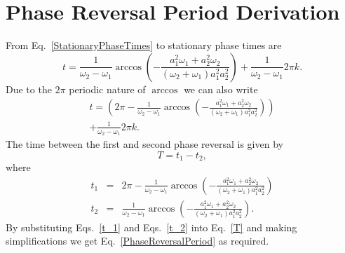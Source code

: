 \documentclass[11pt,draftcls,onecolumn]{IEEEtran}
\begin{document}
\section{Phase Reversal Period Derivation}\label{ReversalPeriodDerivation}
From Eq.~\ref{StationaryPhaseTimes} to stationary phase times are
\begin{equation}
    t=\frac{1}{\omega_2-\omega_1}\arccos\left(-\frac{a_1^2\omega_1 + a_2^2\omega_2}{(\omega_2 +
    \omega_1)a_1^2a_2^2}\right)+\frac{1}{\omega_2-\omega_1}2\pi k.
\end{equation}
Due to the $2\pi$ periodic nature of $\arccos$ we can also write
\begin{eqnarray}
    t= \left(2\pi - \frac{1}{\omega_2-\omega_1}\arccos\left(-\frac{a_1^2\omega_1 + a_2^2\omega_2}{(\omega_2 +
    \omega_1)a_1^2a_2^2}\right)\right) \\ \nonumber
+\frac{1}{\omega_2-\omega_1}2\pi k.
\end{eqnarray}
The time between the first and second phase reversal is given by
\begin{equation}\label{T}
    T = t_1 - t_2,
\end{equation}
where
\begin{eqnarray}
    t_1 &=& 2\pi - \frac{1}{\omega_2-\omega_1}\arccos\left(-\frac{a_1^2\omega_1 + a_2^2\omega_2}{(\omega_2 +
        \omega_1)a_1^2a_2^2}\right)  \label{t_1} \\
    t_2 &=& \frac{1}{\omega_2-\omega_1}\arccos\left(-\frac{a_1^2\omega_1 + a_2^2\omega_2}{(\omega_2 +
        \omega_1)a_1^2a_2^2}\right). \label{t_2}
\end{eqnarray}
By substituting Eqs.~\ref{t_1} and Eqs.~\ref{t_2} into Eq.~\ref{T} and making simplifications we get Eq.~\ref{PhaseReversalPeriod} as required. 


\end{document}
